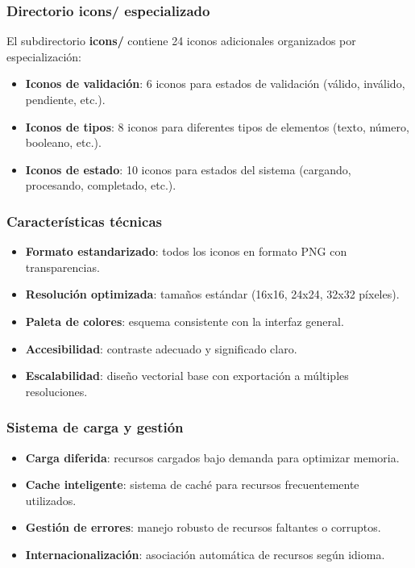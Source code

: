 \subsubsection{Directorio icons/ especializado}

El subdirectorio \textbf{icons/} contiene 24 iconos adicionales organizados por especialización:

\begin{itemize}
    \item \textbf{Iconos de validación}: 6 iconos para estados de validación (válido, inválido, pendiente, etc.).
    \item \textbf{Iconos de tipos}: 8 iconos para diferentes tipos de elementos (texto, número, booleano, etc.).
    \item \textbf{Iconos de estado}: 10 iconos para estados del sistema (cargando, procesando, completado, etc.).
\end{itemize}

\subsubsection{Características técnicas}

\begin{itemize}
    \item \textbf{Formato estandarizado}: todos los iconos en formato PNG con transparencias.
    \item \textbf{Resolución optimizada}: tamaños estándar (16x16, 24x24, 32x32 píxeles).
    \item \textbf{Paleta de colores}: esquema consistente con la interfaz general.
    \item \textbf{Accesibilidad}: contraste adecuado y significado claro.
    \item \textbf{Escalabilidad}: diseño vectorial base con exportación a múltiples resoluciones.
\end{itemize}

\subsubsection{Sistema de carga y gestión}

\begin{itemize}
    \item \textbf{Carga diferida}: recursos cargados bajo demanda para optimizar memoria.
    \item \textbf{Cache inteligente}: sistema de caché para recursos frecuentemente utilizados.
    \item \textbf{Gestión de errores}: manejo robusto de recursos faltantes o corruptos.
    \item \textbf{Internacionalización}: asociación automática de recursos según idioma.
\end{itemize}

